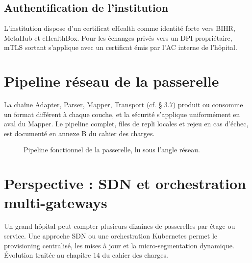\subsection{Authentification de l'institution}

L'institution dispose d'un certificat eHealth comme identité forte vers BIHR, MetaHub et eHealthBox. Pour les échanges privés vers un DPI propriétaire, mTLS sortant s'applique avec un certificat émis par l'AC interne de l'hôpital.

\section{Pipeline réseau de la passerelle}
\label{sec:pipeline-reseau}

La chaîne Adapter, Parser, Mapper, Transport (cf. § 3.7) produit ou consomme un format différent à chaque couche, et la sécurité s'applique uniformément en aval du Mapper. Le pipeline complet, files de repli locales et rejeu en cas d'échec, est documenté en annexe B du cahier des charges.

\begin{figure}[h]
  \centering
  \resizebox{\linewidth}{!}{}
  \caption{Pipeline fonctionnel de la passerelle, lu sous l'angle réseau.}
  \label{fig:rapport-pipeline-reseau}
\end{figure}

\section{Perspective : SDN et orchestration multi-gateways}
\label{sec:sdn}

Un grand hôpital peut compter plusieurs dizaines de passerelles par étage ou service. Une approche SDN ou une orchestration Kubernetes permet le provisioning centralisé, les mises à jour et la micro-segmentation dynamique. Évolution traitée au chapitre 14 du cahier des charges.
